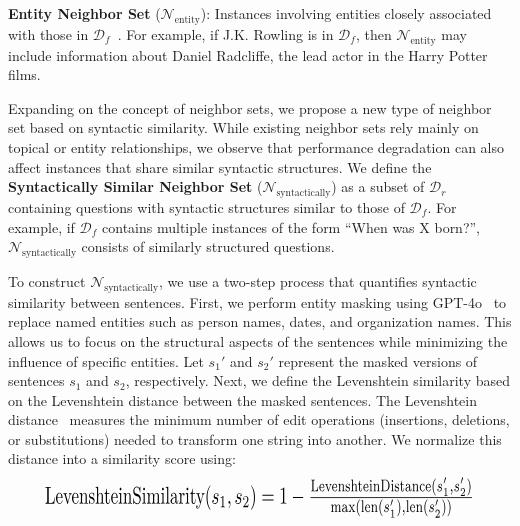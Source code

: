 \noindent
\textbf{Entity Neighbor Set} ($\mathcal{N}_{\text{entity}}$): Instances involving entities closely associated with those in $\mathcal{D}_f$~\citep{rwku, choi2024opt}. For example, if J.K. Rowling is in $\mathcal{D}_f$, then $\mathcal{N}_{\text{entity}}$ may include information about Daniel Radcliffe, the lead actor in the Harry Potter films.

Expanding on the concept of neighbor sets, we propose a new type of neighbor set based on syntactic similarity. 
While existing neighbor sets rely mainly on topical or entity relationships, we observe that performance degradation can also affect instances that share similar syntactic structures. 
We define the \textbf{Syntactically Similar Neighbor Set} ($\mathcal{N}_{\text{syntactically}}$) as a subset of $\mathcal{D}_r$ containing questions with syntactic structures similar to those of $\mathcal{D}_f$. For example, if $\mathcal{D}_f$ contains multiple instances of the form “When was X born?”, $\mathcal{N}_{\text{syntactically}}$ consists of similarly structured questions.

To construct $\mathcal{N}_{\text{syntactically}}$, we use a two-step process that quantifies syntactic similarity between sentences. First, we perform entity masking using GPT-4o~\citep{hurst2024gpt4o} to replace named entities such as person names, dates, and organization names. This allows us to focus on the structural aspects of the sentences while minimizing the influence of specific entities. Let $s_1'$ and $s_2'$ represent the masked versions of sentences $s_1$ and $s_2$, respectively.
Next, we define the Levenshtein similarity based on the Levenshtein distance between the masked sentences. The Levenshtein distance~\cite{LevenshteinDistance} measures the minimum number of edit operations (insertions, deletions, or substitutions) needed to transform one string into another. We normalize this distance into a similarity score using:
\begin{equation}
\label{eq:LevenshteinSimilarity}
\resizebox{0.89\hsize}{0.055\hsize}{$
\text{LevenshteinSimilarity}(s_1, s_2) = 1 - \frac{\text{LevenshteinDistance}(s_1', s_2')}{\max(\text{len}(s_1'), \text{len}(s_2'))}$}
\end{equation}

